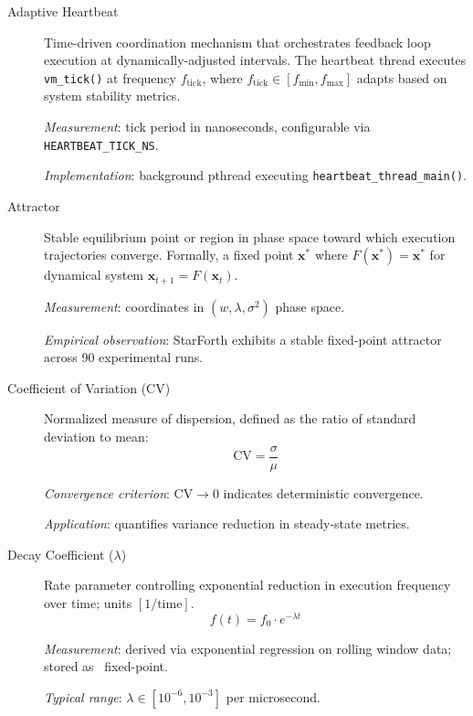 \begin{description}

\item[Adaptive Heartbeat]
Time-driven coordination mechanism that orchestrates feedback loop execution
at dynamically-adjusted intervals. The heartbeat thread executes
\texttt{vm\_tick()} at frequency $f_{\text{tick}}$, where
$f_{\text{tick}} \in [f_{\min}, f_{\max}]$ adapts based on system stability
metrics.

\textit{Measurement}: tick period in nanoseconds, configurable via
\texttt{HEARTBEAT\_TICK\_NS}.

\textit{Implementation}: background pthread executing
\texttt{heartbeat\_thread\_main()}.

\item[Attractor]
Stable equilibrium point or region in phase space toward which execution
trajectories converge. Formally, a fixed point $\mathbf{x}^*$ where
$F(\mathbf{x}^*) = \mathbf{x}^*$ for dynamical system
$\mathbf{x}_{t+1} = F(\mathbf{x}_t)$.

\textit{Measurement}: coordinates in $(w, \lambda, \sigma^2)$ phase space.

\textit{Empirical observation}: StarForth exhibits a stable fixed-point
attractor across 90 experimental runs.

\item[Coefficient of Variation (CV)]
Normalized measure of dispersion, defined as the ratio of standard deviation
to mean:
\begin{equation*}
  \mathrm{CV} = \frac{\sigma}{\mu}
\end{equation*}

\textit{Convergence criterion}: $\mathrm{CV} \to 0$ indicates deterministic
convergence.

\textit{Application}: quantifies variance reduction in steady-state metrics.

\item[Decay Coefficient ($\lambda$)]
Rate parameter controlling exponential reduction in execution frequency over
time; units $[1/\text{time}]$.
\begin{equation*}
  f(t) = f_0 \cdot e^{-\lambda t}
\end{equation*}

\textit{Measurement}: derived via exponential regression on rolling window
data; stored as \Qtype\ fixed-point.

\textit{Typical range}: $\lambda \in [10^{-6}, 10^{-3}]$ per microsecond.


\end{description}
